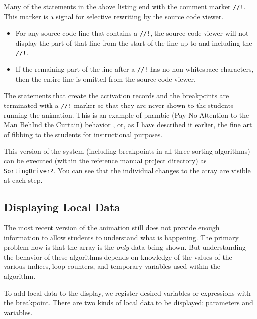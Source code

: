 \documentclass[11pt,titlepage]{book}
\begin{document}
Many of the statements in the above listing end with the comment
marker \texttt{//!}. This marker is a signal for selective rewriting
by the source code viewer.
\begin{itemize}
\item For any source code line that contains a \texttt{//!}, the
  source code viewer will not display the part of that line from the
  start of the line up to and including the \texttt{//!}.
\item If the remaining part of the line after a \texttt{//!} has no
  non-whitespace characters, then the entire line is omitted from the
  source code viewer.
\end{itemize}
The statements that create the activation records and the breakpoints
are terminated with a \texttt{//!} marker so that they are never shown
to the students running the animation. This is an example of pnambic
(Pay No Attention to the Man BehInd the Curtain) behavior
\cite{pnambic}, or, as I have described it earlier, the fine art of
fibbing to the students for instructional purposes.

This version of the system (including breakpoints in all three sorting algorithms) can be executed (within the reference manual project
directory) as \texttt{SortingDriver2}. You can see that the individual changes to the array are visible at each step.


\subsection{Displaying Local Data}

The most recent version of the animation still does not provide enough
information to allow students to understand what is happening. The
primary problem now is that the array is the {\em only} data being
shown. But understanding the behavior of these algorithms depends on
knowledge of the values of the various indices, loop counters, and
temporary variables used within the algorithm.

To add local data to the display, we register desired variables or expressions with the breakpoint. There are two kinds of local data to be displayed: parameters and variables.
\end{document}
